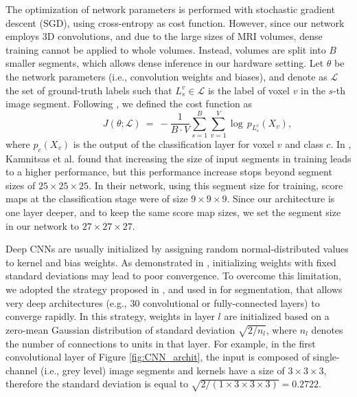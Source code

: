 \documentclass[twoside,fleqn,espcrc2]{elsarticle}
\newcommand{\vold}[1]{$#1\!\times\!#1\!\times\!#1$}
\begin{document}
The optimization of network parameters is performed with stochastic gradient descent (SGD), using cross-entropy as cost function. However, since our network employs 3D convolutions, and due to the large sizes of MRI volumes, dense training cannot be applied to whole volumes. Instead, volumes are split into $B$ smaller segments, which allows dense inference in our hardware setting. Let $\theta$ be the network parameters (i.e., convolution weights and biases), and denote as $\mathcal{L}$ the set of ground-truth labels such that $L^v_s \in \mathcal{L}$ is the label of voxel $v$ in the $s$-th image segment. Following \cite{kamnitsas2016efficient}, we defined the cost function as
\begin{equation}
\qquad \qquad  J(\theta; \mathcal{L}) \ = \ 
    -\frac{1}{B\!\cdot\!V} \sum^{B}_{s=1} \sum^{V}_{v=1} \log \, p_{L^v_s}(X_v),
\end{equation}
where $p_c(X_v)$ is the output of the classification layer for voxel $v$ and class $c$. In \cite{kamnitsas2016efficient}, Kamnitsas et al. found that increasing the size of input segments in training leads to a higher performance, but this performance increase stops beyond segment sizes of \vold{25}. In their network, using this segment size for training, score maps at the classification stage were of size \vold{9}. Since our architecture is one layer deeper, and to keep the same score map sizes, we set the segment size in our network to \vold{27}.


Deep CNNs are usually initialized by assigning random normal-distributed values to kernel and bias weights. As demonstrated in \cite{simonyan2014very}, initializing weights with fixed standard deviations may lead to poor convergence. To overcome this limitation, we adopted the strategy proposed in \cite{he2015delving}, and used in \cite{kamnitsas2016efficient} for segmentation, that allows very deep architectures (e.g., 30 convolutional or fully-connected layers) to converge rapidly. In this strategy, weights in layer $l$ are initialized based on a zero-mean Gaussian distribution of standard deviation  $\sqrt{2/n_l}$, where $n_l$ denotes the number of connections to units in that layer. For example, in the first convolutional layer of Figure \ref{fig:CNN_archit}, the input is composed of single-channel (i.e., grey level) image segments and kernels have a size of \vold{3}, therefore the standard deviation is equal to $\sqrt{2/(1\times3\times3\times3)} = 0.2722$.
\end{document}
